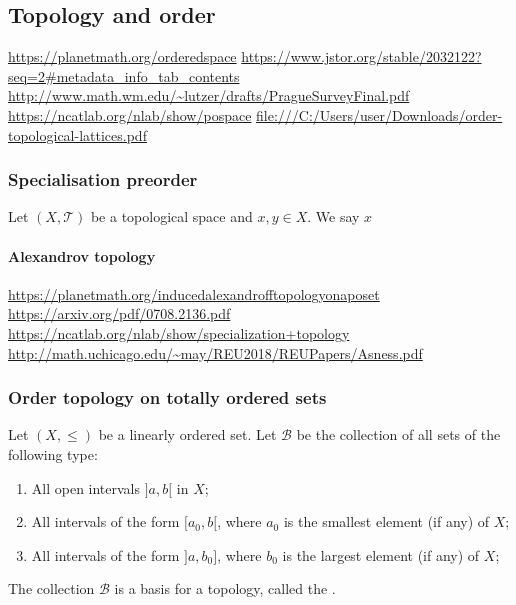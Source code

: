 \subsection{Topology and order}
\begin{definition}

\end{definition}

\url{https://planetmath.org/orderedspace}
\url{https://www.jstor.org/stable/2032122?seq=2#metadata_info_tab_contents}
\url{http://www.math.wm.edu/~lutzer/drafts/PragueSurveyFinal.pdf}
\url{https://ncatlab.org/nlab/show/pospace}
\url{file:///C:/Users/user/Downloads/order-topological-lattices.pdf}

\subsubsection{Specialisation preorder}
\begin{definition}
Let $(X,\mathcal{T})$ be a topological space and $x,y\in X$. We say $x$
\end{definition}

\paragraph{Alexandrov topology}
\url{https://planetmath.org/inducedalexandrofftopologyonaposet}
\url{https://arxiv.org/pdf/0708.2136.pdf}
\url{https://ncatlab.org/nlab/show/specialization+topology}
\url{http://math.uchicago.edu/~may/REU2018/REUPapers/Asness.pdf}

\subsubsection{Order topology on totally ordered sets}
\begin{definition}
Let $(X,\leq)$ be a linearly ordered set. Let $\mathcal{B}$ be the collection of all sets of the following type:
\begin{enumerate}
\item All open intervals $]a,b[$ in $X$;
\item All intervals of the form $[a_0, b[$, where $a_0$ is the smallest element (if any) of $X$;
\item All intervals of the form $]a, b_0]$, where $b_0$ is the largest element (if any) of $X$;
\end{enumerate}
The collection $\mathcal{B}$ is a basis for a topology, called the .
\end{definition}

